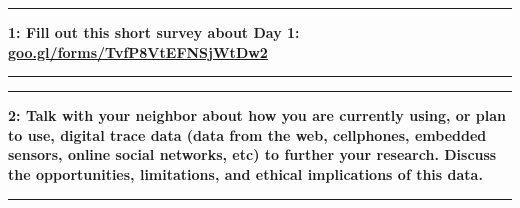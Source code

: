 \documentclass[11pt]{article}
\newcommand\question[2]{\vspace{.25in}\hrule\textbf{#1: #2}\vspace{.5em}\hrule\vspace{.10in}}
\begin{document}
\raggedright
\newcommand\NAME{Allie Morgan} 

\vspace{-0.2 in}
\question{1}{Fill out this short survey about Day 1: \href{https://goo.gl/forms/TvfP8VtEFNSjWtDw2}{goo.gl/forms/TvfP8VtEFNSjWtDw2}} 
\vspace{1 in}

\question{2}{Talk with your neighbor about how you are currently using, or plan to use, digital trace data (data from the web, cellphones, embedded sensors, online social networks, etc) to further your research. Discuss the opportunities, limitations, and ethical implications of this data.} 
\end{document}
